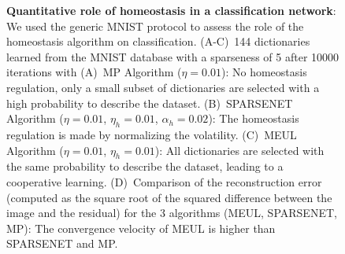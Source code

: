 {\begin{figure}[!ht]
{}
\caption{
{\bf Quantitative role of homeostasis in a classification network}: We used the generic MNIST protocol to assess the role of the homeostasis algorithm on classification. %
 {\sf (A-C)}~144 dictionaries learned from the MNIST database with a sparseness of 5 after 10000 iterations with {\sf (A)}~MP Algorithm ($\eta=0.01$): No homeostasis regulation, only a small subset of dictionaries are selected with a high probability to describe the dataset.
{\sf (B)}~SPARSENET Algorithm ($\eta=0.01$, $\eta_h=0.01$, $\alpha_h=0.02$): The homeostasis regulation is made by normalizing the volatility.
{\sf (C)}~MEUL Algorithm ($\eta=0.01$, $\eta_h=0.01$): All dictionaries are selected with the same probability to describe the dataset, leading to a cooperative learning.
 {\sf (D)}~Comparison of the reconstruction error (computed as the square root of the squared difference between the image and the residual) for the 3 algorithms (MEUL, SPARSENET, MP): The convergence velocity of MEUL is higher than SPARSENET and MP.
\label{fig:quant}}%
\end{figure}%
}%


\newcommand{\coef}{\mathbf{a}} %
\newcommand{\image}{\mathbf{I}} %
\newcommand{\dico}{\Phi} %


